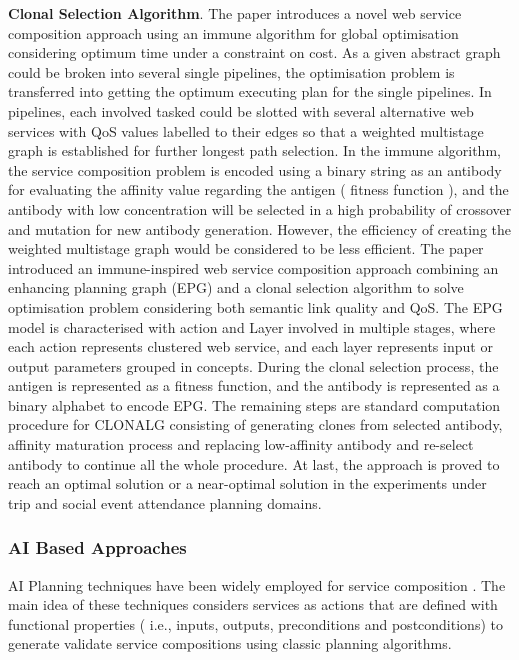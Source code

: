 \textbf{Clonal Selection Algorithm}.
The paper \cite{yan2006immune} introduces a novel web service composition approach using an immune algorithm for global optimisation considering optimum time under a constraint on cost. As a given abstract graph could be broken into several single pipelines, the optimisation problem is transferred into getting the optimum executing plan for the single pipelines. In pipelines, each involved tasked could be slotted with several alternative web services with QoS values labelled to their edges so that a weighted multistage graph is established for further longest path selection. In the immune algorithm, the service composition problem is encoded using a binary string as an antibody for evaluating the affinity value regarding the antigen ( fitness function ), and the antibody with low concentration will be selected in a high probability of crossover and mutation for new antibody generation. However, the efficiency of creating the weighted multistage graph would be considered to be less efficient. The paper \cite{pop2009immune} introduced an immune-inspired web service composition approach combining an enhancing planning graph (EPG) and a clonal selection algorithm to solve optimisation problem considering both semantic link quality and QoS.  The EPG model is characterised with action and Layer involved in multiple stages, where each action represents clustered web service, and each layer represents input or output parameters grouped in concepts.   During the clonal selection process, the antigen is represented as a fitness function, and the antibody is represented as a binary alphabet to encode EPG.  The remaining steps are standard computation procedure for CLONALG consisting of generating clones from selected antibody, affinity maturation process and replacing low-affinity antibody and re-select antibody to continue all the whole procedure. At last, the approach is proved to reach an optimal solution or a near-optimal solution in the experiments under trip and social event attendance planning domains.

\subsubsection{AI Based Approaches}

AI Planning techniques have been widely employed for service composition \cite{markou2015non,peer2005web}. The main idea of these techniques considers services as actions that are defined with functional properties ( i.e., inputs, outputs, preconditions and postconditions) to generate validate service compositions using classic planning algorithms. 

